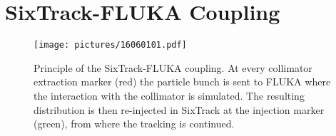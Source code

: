 


\section{SixTrack-FLUKA Coupling}

\begin{figure}[b]  
    \centering
    \texttt{[image: pictures/16060101.pdf]}
    \caption{Principle of the SixTrack-FLUKA coupling. At every collimator extraction marker (red) the particle bunch is sent to FLUKA where the interaction with the collimator is simulated. The resulting distribution is then re-injected in SixTrack at the injection marker (green), from where the tracking is continued.}  
    \label{pic:16060101}
\end{figure}


